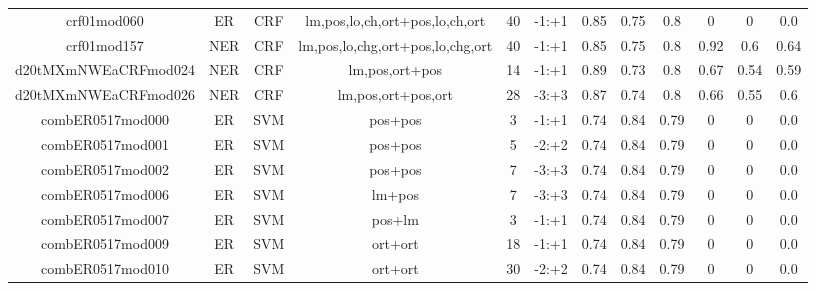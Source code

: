 \documentclass[a4paper]{article}
\begin{document}
\begin{landscape}
\begin{center}
\begin{tabular}{ |c|c|c|c|c|c|c|c|c|c|c|c|}
 
 	
 	\small{ crf01mod060 } & ER & CRF & lm,pos,lo,ch,ort+pos,lo,ch,ort  &  40 &  -1:+1  &  0.85 & 0.75 & 0.8  &  0 & 0 & 0.0 \\
 	

 
 	
 	\small{ crf01mod157 } & NER & CRF & lm,pos,lo,chg,ort+pos,lo,chg,ort  &  40 &  -1:+1  &  0.85 & 0.75 & 0.8  &  0.92 & 0.6 & 0.64 \\
 	

 
 	
 	\small{ d20tMXmNWEaCRFmod024 } & NER & CRF & lm,pos,ort+pos  &  14 &  -1:+1  &  0.89 & 0.73 & 0.8  &  0.67 & 0.54 & 0.59 \\
 	

 
 	
 	\small{ d20tMXmNWEaCRFmod026 } & NER & CRF & lm,pos,ort+pos,ort  &  28 &  -3:+3  &  0.87 & 0.74 & 0.8  &  0.66 & 0.55 & 0.6 \\
 	

 
 	
 	\small{ combER0517mod000 } & ER & SVM & pos+pos  &  3 &  -1:+1  &  0.74 & 0.84 & 0.79  &  0 & 0 & 0.0 \\
 	

 
 	
 	\small{ combER0517mod001 } & ER & SVM & pos+pos  &  5 &  -2:+2  &  0.74 & 0.84 & 0.79  &  0 & 0 & 0.0 \\
 	

 
 	
 	\small{ combER0517mod002 } & ER & SVM & pos+pos  &  7 &  -3:+3  &  0.74 & 0.84 & 0.79  &  0 & 0 & 0.0 \\
 	

 
 	
 	\small{ combER0517mod006 } & ER & SVM & lm+pos  &  7 &  -3:+3  &  0.74 & 0.84 & 0.79  &  0 & 0 & 0.0 \\
 	

 
 	
 	\small{ combER0517mod007 } & ER & SVM & pos+lm  &  3 &  -1:+1  &  0.74 & 0.84 & 0.79  &  0 & 0 & 0.0 \\
 	

 
 	
 	\small{ combER0517mod009 } & ER & SVM & ort+ort  &  18 &  -1:+1  &  0.74 & 0.84 & 0.79  &  0 & 0 & 0.0 \\
 	

 
 	
 	\small{ combER0517mod010 } & ER & SVM & ort+ort  &  30 &  -2:+2  &  0.74 & 0.84 & 0.79  &  0 & 0 & 0.0 \\
 	


\end{tabular}
\end{center}
\end{landscape}
\end{document}
